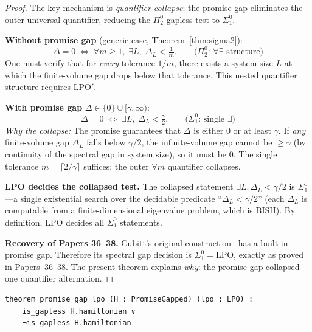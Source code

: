 \documentclass[11pt,a4paper]{article}
\theoremstyle{plain}
\theoremstyle{definition}
\newcommand{\LPO}{\ensuremath{\mathrm{LPO}}}
\newcommand{\LPOj}{\ensuremath{\mathrm{LPO'}}}
\newcommand{\BISH}{\ensuremath{\mathrm{BISH}}}
\begin{document}
\begin{proof}
The key mechanism is \emph{quantifier collapse}: the promise
gap eliminates the outer universal quantifier, reducing the
$\Pi_2^0$ gapless test to $\Sigma_1^0$.

\medskip\noindent
\textbf{Without promise gap} (generic case, Theorem~\ref{thm:sigma2}):
\[
  \Delta = 0 \;\Longleftrightarrow\;
  \forall m \geq 1,\; \exists L,\;
  \Delta_L < \tfrac{1}{m}.
  \qquad\text{($\Pi_2^0$: $\forall\exists$ structure)}
\]
One must verify that for \emph{every} tolerance $1/m$,
there exists a system size $L$ at which the finite-volume
gap drops below that tolerance.  This nested quantifier
structure requires $\LPOj$.

\medskip\noindent
\textbf{With promise gap} $\Delta \in \{0\} \cup [\gamma, \infty)$:
\[
  \Delta = 0 \;\Longleftrightarrow\;
  \exists L,\; \Delta_L < \tfrac{\gamma}{2}.
  \qquad\text{($\Sigma_1^0$: single $\exists$)}
\]
\emph{Why the collapse:}
The promise guarantees that $\Delta$ is either $0$ or at
least $\gamma$.  If \emph{any} finite-volume gap $\Delta_L$
falls below $\gamma/2$, the infinite-volume gap cannot be
$\geq \gamma$ (by continuity of the spectral gap in system size),
so it must be $0$.  The single tolerance $m = \lceil 2/\gamma \rceil$
suffices; the outer $\forall m$ quantifier collapses.

\medskip\noindent
\textbf{LPO decides the collapsed test.}
The collapsed statement $\exists L.\, \Delta_L < \gamma/2$
is $\Sigma_1^0$---a single existential search over
the decidable predicate ``$\Delta_L < \gamma/2$'' (each
$\Delta_L$ is computable from a finite-dimensional eigenvalue
problem, which is $\BISH$).  By definition, $\LPO$ decides
all $\Sigma_1^0$ statements.

\medskip\noindent
\textbf{Recovery of Papers 36--38.}
Cubitt's original construction~\cite{CPgW2015} has a
built-in promise gap.  Therefore its spectral gap decision
is $\Sigma_1^0 = \LPO$, exactly as proved in Papers~36--38.
The present theorem explains \emph{why}: the promise gap
collapsed one quantifier alternation.
\end{proof}

\begin{lstlisting}[caption={Promise gap recovery: \texttt{PromiseGapRecovery.lean}}]
theorem promise_gap_lpo (H : PromiseGapped) (lpo : LPO) :
    is_gapless H.hamiltonian ∨
    ¬is_gapless H.hamiltonian
\end{lstlisting}

\end{document}
